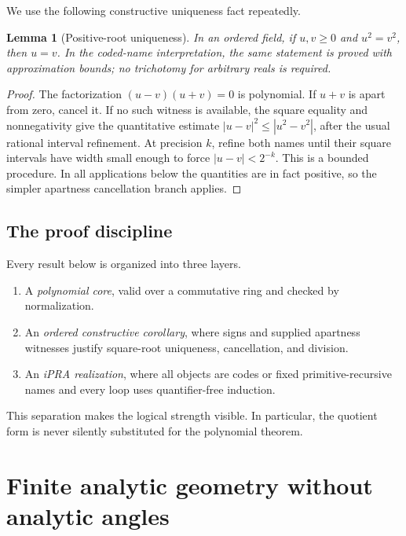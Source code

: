 \documentclass[11pt,letterpaper]{article}
\newtheorem{lemma}[theorem]{Lemma}
\theoremstyle{definition}
\theoremstyle{remark}
\begin{document}
We use the following constructive uniqueness fact repeatedly.

\begin{lemma}[Positive-root uniqueness]
\label{lem:positive-root}
In an ordered field, if \(u,v\ge0\) and \(u^2=v^2\), then \(u=v\).  In the
coded-name interpretation, the same statement is proved with approximation
bounds; no trichotomy for arbitrary reals is required.
\end{lemma}

\begin{proof}
The factorization \((u-v)(u+v)=0\) is polynomial.  If \(u+v\) is apart from
zero, cancel it.  If no such witness is available, the square equality and
nonnegativity give the quantitative estimate
\(|u-v|^2\le |u^2-v^2|\), after the usual rational interval refinement.  At
precision \(k\), refine both names until their square intervals have width
small enough to force \(|u-v|<2^{-k}\).  This is a bounded procedure.  In all
applications below the quantities are in fact positive, so the simpler
apartness cancellation branch applies.
\end{proof}

\subsection{The proof discipline}

Every result below is organized into three layers.

\begin{enumerate}
\item A \emph{polynomial core}, valid over a commutative ring and checked by
normalization.
\item An \emph{ordered constructive corollary}, where signs and supplied
apartness witnesses justify square-root uniqueness, cancellation, and division.
\item An \emph{iPRA realization}, where all objects are codes or fixed
primitive-recursive names and every loop uses quantifier-free induction.
\end{enumerate}

This separation makes the logical strength visible.  In particular, the
quotient form is never silently substituted for the polynomial theorem.

\section{Finite analytic geometry without analytic angles}
\label{sec:geometry}
\end{document}
